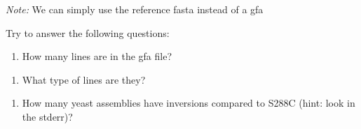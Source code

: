 \documentclass[
]{book}
\newenvironment{Shaded}{\begin{snugshade}}{\end{snugshade}}
\newcommand{\AttributeTok}[1]{\textcolor[rgb]{0.77,0.63,0.00}{#1}}
\newcommand{\DecValTok}[1]{\textcolor[rgb]{0.00,0.00,0.81}{#1}}
\newcommand{\ExtensionTok}[1]{#1}
\newcommand{\FunctionTok}[1]{\textcolor[rgb]{0.00,0.00,0.00}{#1}}
\newcommand{\KeywordTok}[1]{\textcolor[rgb]{0.13,0.29,0.53}{\textbf{#1}}}
\newcommand{\NormalTok}[1]{#1}
\newcommand{\OperatorTok}[1]{\textcolor[rgb]{0.81,0.36,0.00}{\textbf{#1}}}
\newcommand{\PreprocessorTok}[1]{\textcolor[rgb]{0.56,0.35,0.01}{\textit{#1}}}
\newcommand{\VariableTok}[1]{\textcolor[rgb]{0.00,0.00,0.00}{#1}}
\providecommand{\tightlist}{%
  \setlength{\itemsep}{0pt}\setlength{\parskip}{0pt}}
\begin{document}
\emph{Note:} We can simply use the reference fasta instead of a gfa

\begin{Shaded}
\end{Shaded}

Try to answer the following questions:

\begin{enumerate}
\def\labelenumi{\arabic{enumi}.}
\tightlist
\item
  How many lines are in the gfa file?
\end{enumerate}

\begin{Shaded}
\begin{Highlighting}[]

\end{Highlighting}
\end{Shaded}

\begin{enumerate}
\def\labelenumi{\arabic{enumi}.}
\setcounter{enumi}{1}
\tightlist
\item
  What type of lines are they?
\end{enumerate}

\begin{Shaded}
\begin{Highlighting}[]

\end{Highlighting}
\end{Shaded}

\begin{enumerate}
\def\labelenumi{\arabic{enumi}.}
\setcounter{enumi}{2}
\tightlist
\item
  How many yeast assemblies have inversions compared to S288C (hint: look in the stderr)?
\end{enumerate}

\begin{Shaded}
\begin{Highlighting}[]

\end{Highlighting}
\end{Shaded}
\end{document}

